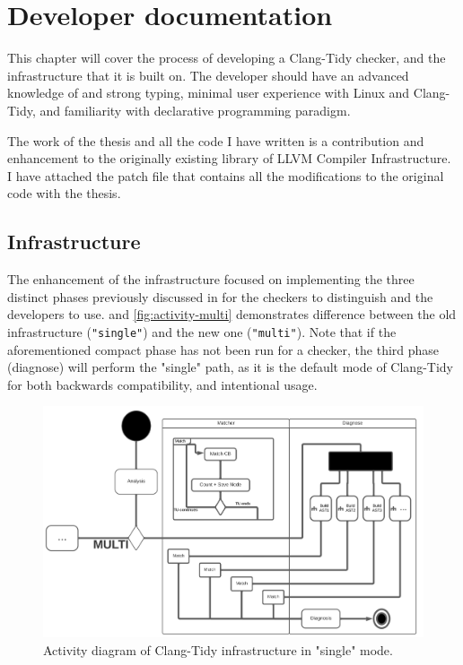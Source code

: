 \chapter{Developer documentation}
\label{ch:impl}

This chapter will cover the process of developing a Clang-Tidy checker, and the infrastructure that it is built on.
The developer should have an advanced knowledge of \CC{} and strong typing, minimal user experience with Linux and
Clang-Tidy, and familiarity with declarative programming paradigm.

The work of the thesis and all the code I have written is a contribution and enhancement to the originally existing library
of LLVM Compiler Infrastructure. I have attached the patch file that contains all the modifications to the original code
with the thesis.

\section{Infrastructure}
\label{sec:dev-infra}

The enhancement of the infrastructure focused on implementing the three distinct phases previously discussed in 
for the checkers to distinguish and the developers to use.
 and \cref{fig:activity-multi} demonstrates difference between the old infrastructure
(\texttt{"single"}) and the new one (\texttt{"multi"}).
Note that if the aforementioned compact phase has not been run for a checker, the third phase (diagnose) will perform the "single"
path, as it is the default mode of Clang-Tidy for both backwards compatibility, and intentional usage.

\begin{figure}[H]
	\includegraphics[width=\linewidth]{images/activity_single.png}
	\caption{Activity diagram of Clang-Tidy infrastructure in "single" mode.}
	\label{fig:activity-single}
\end{figure}

